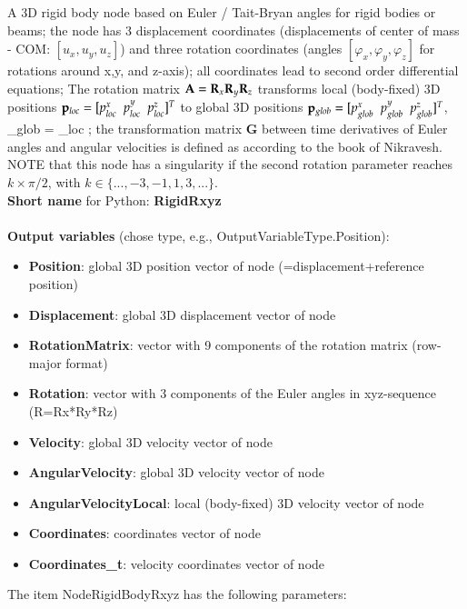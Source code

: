 A 3D rigid body node based on Euler / Tait-Bryan angles for rigid bodies or beams; the node has 3 displacement coordinates (displacements of center of mass - COM: $[u_x,u_y,u_z]$) and three rotation coordinates (angles $[\varphi_x,\varphi_y,\varphi_z]$ for rotations around x,y, and z-axis); all coordinates lead to second order differential equations; The rotation matrix $\mathbf{A}=\mathbf{R}_x \mathbf{R}_y \mathbf{R}_z$ transforms local (body-fixed) 3D positions $\mathbf{p}_{loc} = [p^x_{loc}\;\;p^y_{loc}\;\;p^z_{loc}]^T$ to global 3D positions $\mathbf{p}_{glob} = [p^x_{glob}\;\;p^y_{glob}\;\;p^z_{glob}]^T$, \be \pv_{glob} = \Am \pv_{loc} \ee; the transformation matrix $\mathbf{G}$ between time derivatives of Euler angles and angular velocities is defined as according to the book of Nikravesh. NOTE that this node has a singularity if the second rotation parameter reaches $k \times \pi/2$, with $k \in \{...,-3,-1,1,3,... \}$.
 \\
{\bf Short name} for Python: {\bf RigidRxyz}
 \\\\ 
{\bf Output variables} (chose type, e.g., OutputVariableType.Position): 
\begin{itemize}
    \item {\bf Position}: global 3D position vector of node (=displacement+reference position)
    \item {\bf Displacement}: global 3D displacement vector of node
    \item {\bf RotationMatrix}: vector with 9 components of the rotation matrix (row-major format)
    \item {\bf Rotation}: vector with 3 components of the Euler angles in xyz-sequence (R=Rx*Ry*Rz)
    \item {\bf Velocity}: global 3D velocity vector of node
    \item {\bf AngularVelocity}: global 3D velocity vector of node
    \item {\bf AngularVelocityLocal}: local (body-fixed) 3D velocity vector of node
    \item {\bf Coordinates}: coordinates vector of node
    \item {\bf Coordinates\_t}: velocity coordinates vector of node
\end{itemize}
The item NodeRigidBodyRxyz has the following parameters:
